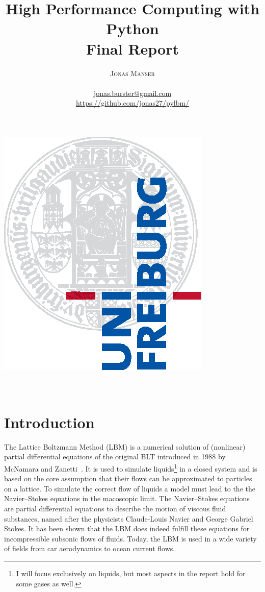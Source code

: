 \documentclass[a4paper,12pt, oneside]{book}
\title{\Huge \textbf{High Performance Computing with Python} \vspace{4mm} \\ \huge Final Report}
\author{\textsc{Jonas Manser} \\ 
\vspace{3mm}\text{4953222}  \\
\vspace{3mm}\url{jonas.burster@gmail.com} \\
\vspace{3mm}\url{https://github.com/jonas27/pylbm/}}
\begin{document}
\makeatletter
\begin{titlepage}
  \begin{center}
    \includegraphics[width=0.5\linewidth]{logos/Uni_Logo-Grundversion_E1_A4_CMYK.eps}\\[4ex]
    {\huge \bfseries  \@title }\\[2ex]
    {\LARGE  \@author}\\[30ex]
    {\large \@date}
  \end{center}
\end{titlepage}
\makeatother
\thispagestyle{empty}
\newpage

\tableofcontents
\thispagestyle{plain}
\listoffigures
\thispagestyle{plain}
\lstlistoflistings
\thispagestyle{plain}






\pagestyle{fancy}
\renewcommand{\chaptermark}[1]{%
  \markboth{\thechapter.\ #1}{}}
\renewcommand{\sectionmark}[1]{%
  \markright{\thesection.\ #1}}


\chapter{Introduction}
The Lattice Boltzmann Method (LBM) is a numerical solution of (nonlinear) partial differential equations of the original BLT introduced in 1988 by McNamara and Zanetti~\cite{mcnamara1988boltzmann-method}.
It is used to simulate liquids\footnote{I will focus exclusively on liquids, but most aspects in the report hold for some gases as well.} in a closed system and is based on the core assumption that their flows can be approximated to particles on a lattice.
To simulate the correct flow of liquids a model must lead to the the Navier–Stokes equations in the macoscopic limit.
The Navier–Stokes equations are partial differential equations to describe the motion of viscous fluid substances, named after the physicists Claude-Louis Navier and George Gabriel Stokes.
It has been shown that the LBM does indeed fulfill these equations for incompressible subsonic flows of fluids.
Today, the LBM is used in a wide variety of fields from car aerodynamics to ocean current flows.
\end{document}
